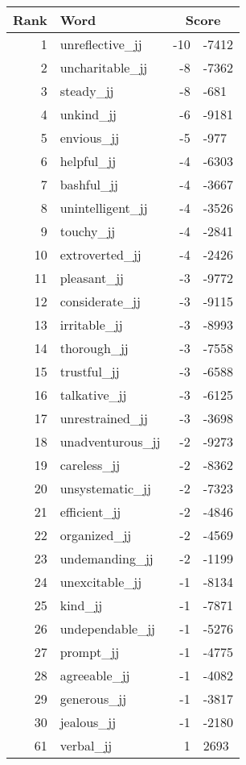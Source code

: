 \begin{longtable}[!htbp]{| rlr@{.}l |}
    \hline
    \textbf{Rank} & \textbf{Word} & \multicolumn{2}{c|}{\textbf{Score}} \\
    \hline
    \endhead
    1 & unreflective\_jj & -10 & -7412 \\
    2 & uncharitable\_jj & -8 & -7362 \\
    3 & steady\_jj & -8 & -681 \\
    4 & unkind\_jj & -6 & -9181 \\
    5 & envious\_jj & -5 & -977 \\
    6 & helpful\_jj & -4 & -6303 \\
    7 & bashful\_jj & -4 & -3667 \\
    8 & unintelligent\_jj & -4 & -3526 \\
    9 & touchy\_jj & -4 & -2841 \\
    10 & extroverted\_jj & -4 & -2426 \\
    11 & pleasant\_jj & -3 & -9772 \\
    12 & considerate\_jj & -3 & -9115 \\
    13 & irritable\_jj & -3 & -8993 \\
    14 & thorough\_jj & -3 & -7558 \\
    15 & trustful\_jj & -3 & -6588 \\
    16 & talkative\_jj & -3 & -6125 \\
    17 & unrestrained\_jj & -3 & -3698 \\
    18 & unadventurous\_jj & -2 & -9273 \\
    19 & careless\_jj & -2 & -8362 \\
    20 & unsystematic\_jj & -2 & -7323 \\
    21 & efficient\_jj & -2 & -4846 \\
    22 & organized\_jj & -2 & -4569 \\
    23 & undemanding\_jj & -2 & -1199 \\
    24 & unexcitable\_jj & -1 & -8134 \\
    25 & kind\_jj & -1 & -7871 \\
    26 & undependable\_jj & -1 & -5276 \\
    27 & prompt\_jj & -1 & -4775 \\
    28 & agreeable\_jj & -1 & -4082 \\
    29 & generous\_jj & -1 & -3817 \\
    30 & jealous\_jj & -1 & -2180 \\
    61 & verbal\_jj & 1 & 2693 \\

\end{longtable}
